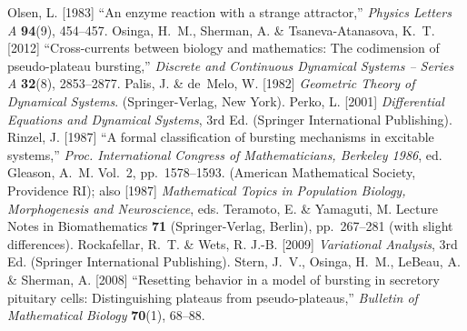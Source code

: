 \documentclass{ws-ijbc}
\begin{document}
\begin{thebibliography}{46}
Olsen, L. [1983]
\newblock \enquote{An enzyme reaction with a strange attractor,}
\newblock \emph{Physics Letters A} \textbf{94}(9), 454--457.
%
Osinga, H.~M., Sherman, A. \& Tsaneva-Atanasova, K.~T. [2012]
\newblock \enquote{Cross-currents between biology and mathematics: The codimension of pseudo-plateau bursting,}
\newblock \emph{Discrete and Continuous Dynamical Systems -- Series A} \textbf{32}(8), 2853--2877.
%
%
Palis, J. \& de~Melo, W. [1982]
\newblock \emph{Geometric Theory of Dynamical Systems}.
\newblock (Springer-Verlag, New York).
%
Perko, L. [2001] \emph{Differential Equations and Dynamical Systems}, 3rd Ed.
  (Springer International Publishing).
%
% 
Rinzel, J. [1987]
\newblock \enquote{A formal classification of bursting mechanisms in excitable systems,}
\newblock \emph{Proc. International Congress of Mathematicians, Berkeley 1986}, ed. Gleason, A.~M. Vol.~2,  pp.~1578--1593.
\newblock (American Mathematical Society, Providence RI);
\newblock also [1987] \emph{Mathematical Topics in Population Biology, Morphogenesis and Neuroscience}, eds. Teramoto, E. \& Yamaguti, M. Lecture Notes in Biomathematics \textbf{71} (Springer-Verlag, Berlin), pp.~267--281 (with slight differences).
%
Rockafellar, R.~T. \& Wets, R. J.-B. [2009]
\newblock \emph{Variational Analysis}, 3rd Ed.
\newblock (Springer International Publishing).
%
Stern, J.~V., Osinga, H.~M., LeBeau, A. \& Sherman, A. [2008]
\newblock \enquote{Resetting behavior in a model of bursting in secretory pituitary cells: Distinguishing plateaus from pseudo-plateaus,}
\newblock \emph{Bulletin of Mathematical Biology} \textbf{70}(1), 68--88.

\end{thebibliography}
\end{document}
